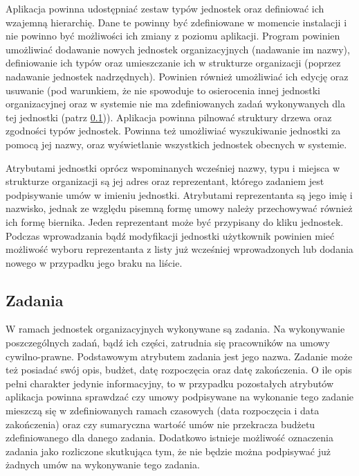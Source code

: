 Aplikacja powinna udostępniać zestaw typów jednostek oraz definiować ich wzajemną hierarchię. Dane te powinny być zdefiniowane w momencie instalacji i nie powinno być możliwości ich zmiany z poziomu aplikacji. Program powinien umożliwiać dodawanie nowych jednostek organizacyjnych (nadawanie im nazwy), definiowanie ich typów oraz umieszczanie ich w strukturze organizacji (poprzez nadawanie jednostek nadrzędnych). Powinien również umożliwiać ich edycję oraz usuwanie (pod warunkiem, że nie spowoduje to osierocenia innej jednostki organizacyjnej oraz w systemie nie ma zdefiniowanych zadań wykonywanych dla tej jednostki (patrz \ref{zadania})). Aplikacja powinna pilnować struktury drzewa oraz zgodności typów jednostek. Powinna też umożliwiać wyszukiwanie jednostki za pomocą jej nazwy, oraz wyświetlanie wszystkich jednostek obecnych w systemie.

Atrybutami jednostki oprócz wspominanych wcześniej nazwy, typu i miejsca w strukturze organizacji są jej adres oraz reprezentant, którego zadaniem jest podpisywanie umów w imieniu jednostki. Atrybutami reprezentanta są jego imię i nazwisko, jednak ze względu pisemną formę umowy należy przechowywać również ich formę biernika. Jeden reprezentant może być przypisany do kliku jednostek. Podczas wprowadzania bądź modyfikacji jednostki użytkownik powinien mieć możliwość wyboru reprezentanta z listy już wcześniej wprowadzonych lub dodania nowego w przypadku jego braku na liście.


\subsection[Zadania][Zadania]{Zadania}
\label{zadania}
W ramach jednostek organizacyjnych wykonywane są zadania. Na wykonywanie poszczególnych zadań, bądź ich części, zatrudnia się pracowników na umowy cywilno-prawne. Podstawowym atrybutem zadania jest jego nazwa. Zadanie może też posiadać swój opis, budżet, datę rozpoczęcia oraz datę zakończenia. O ile opis pełni charakter jedynie informacyjny, to w przypadku pozostałych atrybutów aplikacja powinna sprawdzać czy umowy podpisywane na wykonanie tego zadanie mieszczą się w zdefiniowanych ramach czasowych (data rozpoczęcia i data zakończenia) oraz czy sumaryczna wartość umów nie przekracza budżetu zdefiniowanego dla danego zadania. Dodatkowo istnieje możliwość oznaczenia zadania jako rozliczone skutkująca tym, że nie będzie można podpisywać już żadnych umów na wykonywanie tego zadania. 

